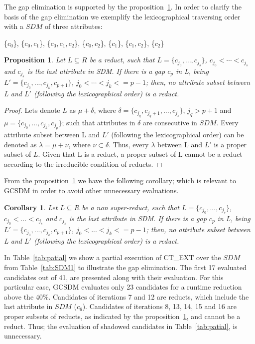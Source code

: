\documentclass[authoryear,11pt]{elsarticle}
\newtheorem{proposition}{Proposition}
\newtheorem{proof}{Proof}
\newtheorem{corollary}{Corollary}
\begin{document}
	
	The gap elimination is supported by the proposition~\ref{prop:gap}. In order to clarify the basis of the gap
	elimination we exemplify the lexicographical traversing order with a $SDM$ of three attributes:
	
	\{$c_0$\}, \{$c_0,c_1$\}, \{$c_0,c_1,c_2$\}, \{$c_0,c_2$\}, \{$c_1$\}, \{$c_1,c_2$\}, \{$c_2$\}
		
	\begin{proposition}\label{prop:gap} 
		Let $L \subseteq R$ be a reduct, such that $L = \lbrace c_{j_0},...,c_{j_s}\rbrace$, $c_{j_0}<\cdots
		<c_{j_s}$ and $c_{j_s}$ is the last attribute in SDM. If there is a gap $c_p$ in L, being $L' = \lbrace
		c_{j_0},...,c_{j_k},c_{p+1}\rbrace$, $j_0<\cdots <j_k<=p-1$; then, no attribute subset between L and $L'$
		(following the lexicographical order) is a reduct.
	\end{proposition}	
	
	\begin{proof}
		Lets denote $L$ as $\mu+\delta$, where $\delta= \lbrace c_{j_q}, c_{j_q+1},...,c_{j_s}\rbrace$, $j_q>p+1$
		and $\mu = \lbrace c_{j_0},...,c_{j_k},c_{j_p}\rbrace$; such that attributes in $\delta$ are consecutive 
		in $SDM$. Every attribute subset between L and $L'$ (following the lexicographical order) can be 
		denoted as $\lambda=\mu+\nu$, where $\nu \subset \delta$. Thus, every $\lambda$ between L and $L'$ is a
		proper subset of $L$. Given that L is a reduct, a proper subset of L cannot be a reduct according to the 
		irreducible condition of reducts. 
	\end{proof}
	
	From the proposition~\ref{prop:gap} we have the following corollary; which is relevant to GCSDM in order to
	avoid other unnecessary evaluations.
	
	\begin{corollary}\label{coro:gap} 
		Let $L \subseteq R$ be a non super-reduct, such that $L = \lbrace c_{j_0},...,c_{j_s}\rbrace$, 
		$c_{j_0}<...<c_{j_s}$ and $c_{j_s}$ is the last attribute in SDM. If there is a gap $c_p$ in L, being 
		$L' = \lbrace c_{j_0},...,c_{j_k},c_{p+1}\rbrace$, $j_0<...<j_k<=p-1$; then, no attribute 
		subset between L and $L'$ (following the lexicographical order) is a reduct.
	\end{corollary}
	
	In Table~\ref{tab:patial} we show a partial execution of CT\_EXT over the $SDM$ from Table~\ref{tab:SDM1} to 
	illustrate the gap elimination. The first 17 evaluated candidates out of 41, are presented 
	along with their evaluation. For this particular case, GCSDM evaluates only 23 candidates 
	for a runtime reduction above the 40\%. Candidates of iterations 7 and 12 are reducts, which include the last
	attribute in $SDM$ ($c_6$). Candidates of iterations 8, 13, 14, 15 and 16 are proper subsets of reducts, as
	indicated by the proposition~\ref{prop:gap}, and cannot be a reduct. Thus; the evaluation of shadowed
	candidates in Table~\ref{tab:patial}, is unnecessary. 
	
\end{document}
